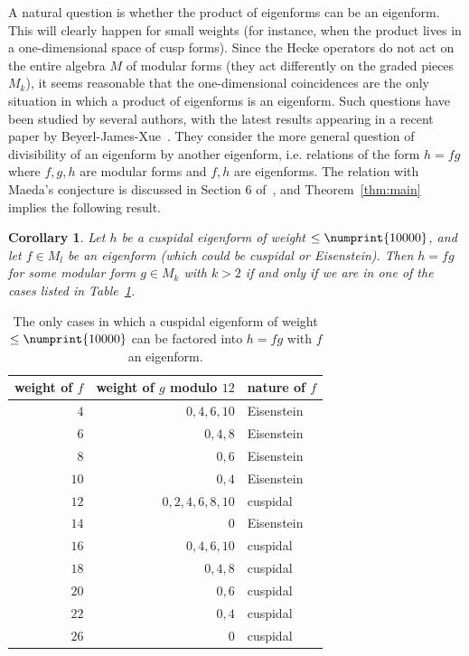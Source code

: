 \documentclass[11pt]{article}
\theoremstyle{plain}
\newtheorem{corollary}[theorem]{Corollary}
\theoremstyle{definition}
\theoremstyle{remark}
\numberwithin{equation}{section}
\newcommand{\bound}{\numprint{10000}}
\begin{document}
A natural question is whether the product of eigenforms can be an eigenform.
This will clearly happen for small weights (for instance, when the product
lives in a one-dimensional space of cusp forms).  Since the Hecke operators
do not act on the entire algebra $M$ of modular forms (they act
differently on the graded pieces $M_k$), it seems reasonable that the
one-dimensional coincidences are the only situation in which a product of
eigenforms is an eigenform.  Such questions have been studied by several
authors, with the latest results appearing in a recent paper by
Beyerl-James-Xue~\cite{BeyerlJamesXue}.  They consider the more general question
of divisibility of an
eigenform by another eigenform, i.e. relations of the form $h=fg$ where
$f,g,h$ are modular forms and $f,h$ are eigenforms.  The relation with Maeda's 
conjecture is discussed in Section 6 of~\cite{BeyerlJamesXue}, and 
Theorem~\ref{thm:main} implies the following result.

\begin{corollary}
  Let $h$ be a cuspidal eigenform of weight $\leq\bound$, and let 
  $f\in M_l$ be an eigenform
  (which could be cuspidal or Eisenstein).  Then $h=fg$ for some modular form
  $g\in M_k$ with $k>2$ if and only if we are in one of the cases listed in 
  Table~\ref{tbl:div_eigen}.
\end{corollary}

\begin{table}[h]
  \begin{center}
  \begin{tabular}{r|r|l}
    weight of $f$ & weight of $g$ modulo $12$ & nature of $f$ \\ \hline
    $4$ & $0,4,6,10$ & Eisenstein \\
    $6$ & $0,4,8$ & Eisenstein \\
    $8$ & $0,6$ & Eisenstein \\
    $10$ & $0,4$ & Eisenstein \\
    $12$ & $0,2,4,6,8,10$ & cuspidal\\
    $14$ & $0$ & Eisenstein \\
    $16$ & $0,4,6,10$ & cuspidal\\
    $18$ & $0,4,8$ & cuspidal\\
    $20$ & $0,6$ & cuspidal\\
    $22$ & $0,4$ & cuspidal\\
    $26$ & $0$ & cuspidal
  \end{tabular}
\end{center}
  \caption{The only cases in which a cuspidal eigenform of weight $\leq\bound$
  can be factored into $h=fg$ with $f$ an eigenform.}
  \label{tbl:div_eigen}
\end{table}
\end{document}

